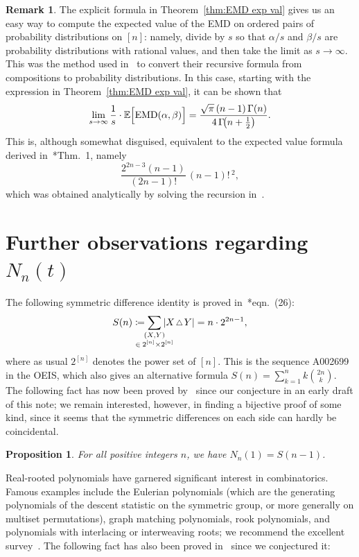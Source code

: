 \documentclass[11pt]{amsart}
\theoremstyle{plain}
\newtheorem{prop}[theorem]{Proposition}
\theoremstyle{definition}
\newtheorem{rem}[theorem]{Remark}
\numberwithin{equation}{section}
\newcommand{\EMD}{{\rm EMD}}
\newcommand{\smtriangle}{\scalebox{.8}{$\,\triangle\,$}}
\begin{document}
\begin{rem}
\label{rem FV}
    The explicit formula in Theorem~\ref{thm:EMD exp val} gives us an easy way to compute the expected value of the EMD on ordered pairs of probability distributions on $[n]$:
    namely, divide by $s$ so that $\alpha/s$ and $\beta/s$ are probability distributions with rational values, and then take the limit as $s \rightarrow \infty$.
    This was the method used in~\cite{BW} to convert their recursive formula from compositions to probability distributions.
    In this case, starting with the expression in Theorem~\ref{thm:EMD exp val}, it can be shown that
    \[
    \lim_{s \rightarrow \infty} \frac{1}{s} \cdot \mathbb{E}\Big[\EMD(\alpha,\beta)\Big] = \frac{\sqrt{\pi} \, (n-1) \,\Gamma(n)}{4 \, \Gamma\!\!\left(n + \frac{1}{2}\right)}.
    \]
    This is, although somewhat disguised, equivalent to the expected value formula derived in~\cite{FV}*{Thm.~1}, namely
    \[
    \frac{2^{2n-3}(n-1)}{(2n-1)!}\,(n-1)! \, ^2,
    \]
    which was obtained analytically  by solving the recursion in~\cite{BW}.
\end{rem}

\section{Further observations regarding $N_n(t)$}
\label{sec:problems}

The following symmetric difference identity is proved in~\cite{LaHaye}*{eqn.~(26)}:
\[
    S(n) \coloneqq \sum_{\mathclap{\substack{(X,Y) \\ \in \: 2^{[n]} \times 2^{[n]}}}} | X \smtriangle Y| = n \cdot 2^{2n-1},
\]
where as usual $2^{[n]}$ denotes the power set of $[n]$.
This is the sequence A002699 in the OEIS, which also gives an alternative formula $S(n) = \sum_{k=1}^n k \binom{2n}{k}$.
The following fact has now been proved by~\cite{Ding} since our conjecture in an early draft of this note;
we remain interested, however, in finding a bijective proof of some kind, since it seems that the symmetric differences on each side can hardly be coincidental.

\begin{prop}
\label{conj N equals S}
    For all positive integers $n$, we have $N_n(1) = S(n-1)$.
\end{prop}

Real-rooted polynomials have garnered significant interest in combinatorics.
Famous examples include the Eulerian polynomials (which are the generating polynomials of the descent statistic on the symmetric group, or more generally on multiset permutations), graph matching polynomials, rook polynomials, and polynomials with interlacing or interweaving roots; we recommend the excellent survey~\cite{Branden}.
The following fact has also been proved in~\cite{Ding} since we conjectured it:
\end{document}
